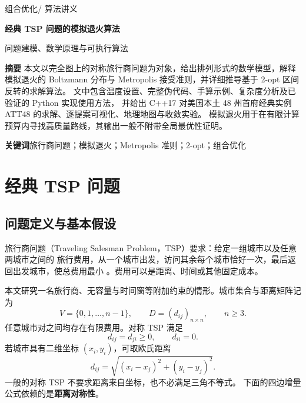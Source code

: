\documentclass[UTF8,a4paper,11pt,fontset=none]{ctexart}
\numberwithin{equation}{section}
\begin{document}
\thispagestyle{plain}
\begin{center}
  {\small\sffamily\color{accent}组合优化\quad / \quad 算法讲义}\par
  \vspace{7pt}
  {\LARGE\sffamily\bfseries 经典 TSP 问题的模拟退火算法}\par
  \vspace{5pt}
  {\normalsize\color{muted}问题建模、数学原理与可执行算法}\par
\end{center}
\vspace{2pt}
\noindent{\color{accent}\rule{\linewidth}{0.7pt}}
\vspace{3pt}

\noindent\textbf{摘要}\quad
本文以完全图上的对称旅行商问题为对象，给出排列形式的数学模型，解释模拟退火的
Boltzmann 分布与 Metropolis 接受准则，并详细推导基于 2-opt 区间反转的求解算法。
文中包含温度设置、完整伪代码、手算示例、复杂度分析及已验证的 Python 实现使用方法，
并给出 C++17 对美国本土 48 州首府经典实例 ATT48 的求解、逐提案可视化、地理地图与收敛实验。
模拟退火用于在有限计算预算内寻找高质量路线，其输出一般不附带全局最优性证明。

\vspace{4pt}
\noindent\textbf{关键词}\quad 旅行商问题；模拟退火；Metropolis 准则；2-opt；组合优化
\vspace{7pt}

\section{经典 TSP 问题}
\subsection{问题定义与基本假设}
旅行商问题（Traveling Salesman Problem，TSP）要求：给定一组城市以及任意两城市之间的
旅行费用，从一个城市出发，访问其余每个城市恰好一次，最后返回出发城市，使总费用最小
\cite{waterloo}。费用可以是距离、时间或其他固定成本。

本文研究一名旅行商、无容量与时间窗等附加约束的情形。城市集合与距离矩阵记为
\begin{equation}
  V=\{0,1,\ldots,n-1\},\qquad D=(d_{ij})_{n\times n},\qquad n\geq3.
\end{equation}
任意城市对之间均存在有限费用。对称 TSP 满足
\begin{equation}
  d_{ij}=d_{ji}\geq0,\qquad d_{ii}=0.
  \label{eq:symmetry}
\end{equation}
若城市具有二维坐标 $(x_i,y_i)$，可取欧氏距离
\begin{equation}
  d_{ij}=\sqrt{(x_i-x_j)^2+(y_i-y_j)^2}.
\end{equation}
一般的对称 TSP 不要求距离来自坐标，也不必满足三角不等式。
下面的四边增量公式依赖的是\textbf{距离对称性}。
\end{document}

